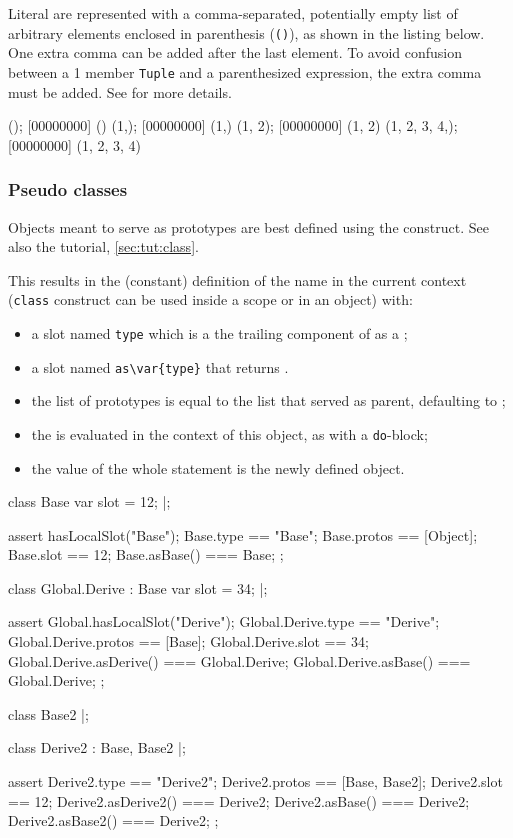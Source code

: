 Literal  are represented with a comma-separated, potentially
empty list of arbitrary elements enclosed in parenthesis (\lstinline|()|),
as shown in the listing below.  One extra comma can be added after the last
element.  To avoid confusion between a 1 member \lstinline{Tuple} and a
parenthesized expression, the extra comma must be added.  See
 for more details.

\begin{urbiscript}
();
[00000000] ()
(1,);
[00000000] (1,)
(1, 2);
[00000000] (1, 2)
(1, 2, 3, 4,);
[00000000] (1, 2, 3, 4)
\end{urbiscript}


\subsubsection{Pseudo classes}
\label{sec:lang:class}

Objects meant to serve as prototypes are best defined using the
 construct.  See also the tutorial, \autoref{sec:tut:class}.


This results in the (constant) definition of the name  in the
current context (\lstinline{class} construct can be used inside a scope or
in an object) with:
\begin{itemize}
\item a slot named \lstinline{type} which is a the trailing component of
   as a ;
\item a slot named \lstinline|as\var{type}| that returns \this.
\item the list of prototypes is equal to the list  that
  served as parent, defaulting to ;
\item the  is evaluated in the context of this object, as with a
  \lstinline{do}-block;
\item the value of the whole statement is the newly defined object.
\end{itemize}

\begin{urbiscript}
class Base
{
  var slot = 12;
}|;

assert
{
  hasLocalSlot("Base");
  Base.type   == "Base";
  Base.protos == [Object];
  Base.slot   == 12;
  Base.asBase() === Base;
};

class Global.Derive : Base
{
  var slot = 34;
}|;

assert
{
  Global.hasLocalSlot("Derive");
  Global.Derive.type     == "Derive";
  Global.Derive.protos   == [Base];
  Global.Derive.slot     == 34;
  Global.Derive.asDerive() === Global.Derive;
  Global.Derive.asBase()   === Global.Derive;
};

class Base2 {}|;

class Derive2 : Base, Base2 {}|;

assert
{
  Derive2.type      == "Derive2";
  Derive2.protos    == [Base, Base2];
  Derive2.slot      == 12;
  Derive2.asDerive2() === Derive2;
  Derive2.asBase()    === Derive2;
  Derive2.asBase2()   === Derive2;
};
\end{urbiscript}


